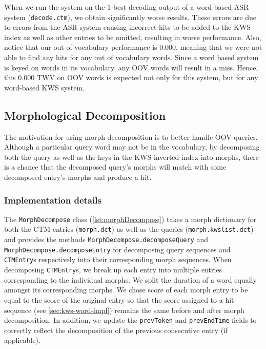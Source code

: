 \documentclass[a4paper,oneside,reqno]{amsart}
\begin{document}
When we run the system on the 1-best decoding output of a word-based ASR system
(\texttt{decode.ctm}), we obtain significantly worse results. These errors are
due to errors from the ASR system causing incorrect hits to be added to the KWS
index as well as other entries to be omitted, resulting in worse performance.
Also, notice that our out-of-vocabulary performance is $0.000$, meaning that we
were not able to find any hits for any out of vocabulary words. Since a word
based system is keyed on words in its vocabulary, any OOV words will result in
a miss. Hence, this $0.000$ TWV on OOV words is expected not only for this
system, but for any word-based KWS system.


\subsection{Morphological Decomposition}

The motivation for using morph decomposition is to better handle OOV queries.
Although a particular query word may not be in the vocabulary, by decomposing
both the query as well as the keys in the KWS inverted index into morphs, there
is a chance that the decomposed query's morphs will match with some decomposed
entry's morphs and produce a hit.

\subsubsection{Implementation details}

The \texttt{MorphDecompose} class (\autoref{lst:morphDecompose}) takes a morph
dictionary for both the CTM entries (\texttt{morph.dct}) as well as the queries
(\texttt{morph.kwslist.dct}) and provides the methods
\texttt{MorphDecompose.decomposeQuery} and
\texttt{MorphDecompose.decomposeEntry} for decomposing query sequences and
\texttt{CTMEntry}s respectively into their corresponding morph sequences. When
decomposing \texttt{CTMEntry}s, we break up each entry into multiple
entries corresponding to the individual morphs. We split the duration of a word
equally amongst its corresponding morphs. We chose score of each morph entry to be equal
to the score of the original entry so that the score assigned to a hit sequence (see
\autoref{sec:kws-word-impl}) remains the same before and after morph
decomposition. In addition, we update the \texttt{prevToken} and
\texttt{prevEndTime} fields to correctly reflect the decomposition of the
previous consecutive entry (if applicable).
\end{document}

